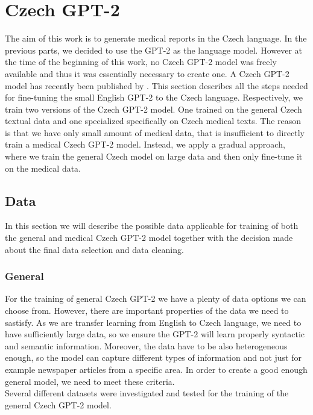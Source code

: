 \section{Czech GPT-2}
\label{sec:czechGpt2}
The aim of this work is to generate medical reports in the Czech language. In the previous parts, we decided to use the GPT-2 as the language model. However at the time of the beginning of this work, no Czech GPT-2 model was freely available and thus it was essentially necessary to create one. A Czech GPT-2 model has recently been published by \citet{hajek_horak2022}. This section describes all the steps needed for fine-tuning the small English GPT-2 to the Czech language. Respectively, we train two versions of the Czech GPT-2 model. One trained on the general Czech textual data and one specialized specifically on Czech medical texts. The reason is that we have only small amount of medical data, that is insufficient to directly train a medical Czech GPT-2 model. Instead, we apply a gradual approach, where we train the general Czech model on large data and then only fine-tune it on the medical data.

\subsection{Data}
\label{sec:gptData}
In this section we will describe the possible data applicable for training of both the general and medical Czech GPT-2 model together with the decision made about the final data selection and data cleaning.

\subsubsection{General}
For the training of general Czech GPT-2 we have a plenty of data options we can choose from. However, there are important properties of the data we need to sastisfy. As we are transfer learning from English to Czech language, we need to have sufficiently large data, so we ensure the GPT-2 will learn properly syntactic and semantic information. Moreover, the data have to be also heterogeneous enough, so the model can capture different types of information and not just for example newspaper articles from a specific area. In order to create a good enough general model, we need to meet these criteria.\\

Several different datasets were investigated and tested for the training of the general Czech GPT-2 model.
